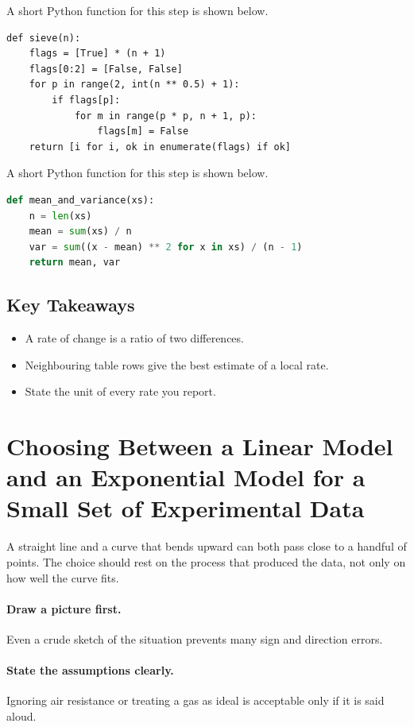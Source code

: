 \documentclass[11pt]{article}
\begin{document}
A short Python function for this step is shown below.

{\small\begin{verbatim}
def sieve(n):
    flags = [True] * (n + 1)
    flags[0:2] = [False, False]
    for p in range(2, int(n ** 0.5) + 1):
        if flags[p]:
            for m in range(p * p, n + 1, p):
                flags[m] = False
    return [i for i, ok in enumerate(flags) if ok]
\end{verbatim}}

A short Python function for this step is shown below.

\begin{lstlisting}[language=Python]
def mean_and_variance(xs):
    n = len(xs)
    mean = sum(xs) / n
    var = sum((x - mean) ** 2 for x in xs) / (n - 1)
    return mean, var
\end{lstlisting}

\subsection*{Key Takeaways}
\begin{itemize}
\item A rate of change is a ratio of two differences.
\item Neighbouring table rows give the best estimate of a local rate.
\item State the unit of every rate you report.
\end{itemize}

\section{Choosing Between a Linear Model and an Exponential Model for a Small Set of Experimental Data}

A straight line and a curve that bends upward can both pass close to a handful of points. The choice should rest on the process that produced the data, not only on how well the curve fits.

\paragraph{Draw a picture first.} Even a crude sketch of the situation prevents many sign and direction errors.

\paragraph{State the assumptions clearly.} Ignoring air resistance or treating a gas as ideal is acceptable only if it is said aloud.
\end{document}

